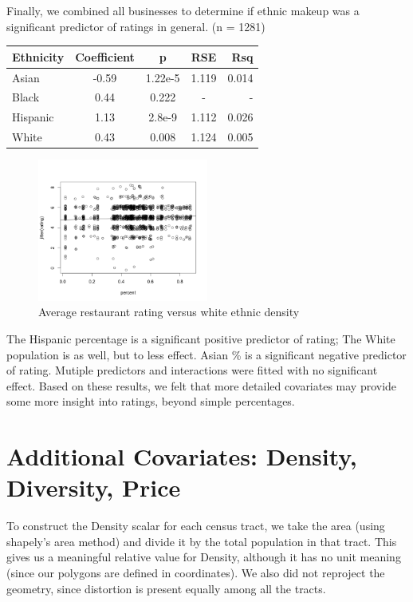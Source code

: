 \documentclass[11pt,twocolumn]{article}
\begin{document}
Finally, we combined all businesses to determine if ethnic makeup was a significant predictor of ratings in general. (n = 1281)

\begin{center}
  \begin{tabular}{| l | c | c | c | r | }
    \hline
    Ethnicity & Coefficient & p & RSE & Rsq \\ \hline \hline
    Asian & -0.59 & 1.22e-5 & 1.119 & 0.014 \\ \hline
    Black & 0.44 & 0.222 & - & - \\ \hline
    Hispanic & 1.13 & 2.8e-9 & 1.112 & 0.026 \\ \hline
    White & 0.43 & 0.008 & 1.124 & 0.005 \\ \hline
  \end{tabular}
\end{center}

\begin{figure}[h!]
  \caption{Average restaurant rating versus white ethnic density}
  \centering
  \includegraphics[width=0.5\textwidth]{whitepeople_presentation}
\end{figure}


The Hispanic percentage is a significant positive predictor of rating; The White population is as well, but to less effect. Asian \% is a significant negative predictor of rating. Mutiple predictors and interactions were fitted with no significant effect. Based on these results, we felt that more detailed covariates may provide some more insight into ratings, beyond simple percentages.

\section{Additional Covariates: Density, Diversity, Price}

To construct the Density scalar for each census tract, we take the area (using shapely's area method) and divide it by the total population in that tract. This gives us a meaningful relative value for Density, although it has no unit meaning (since our polygons are defined in coordinates). We also did not reproject the geometry, since distortion is present equally among all the tracts.
\end{document}
